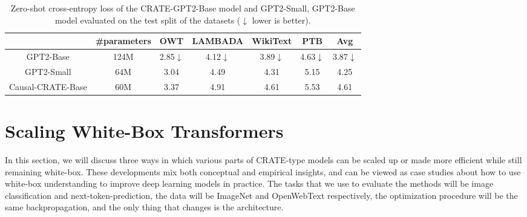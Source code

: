 \documentclass[../../book-main.tex]{subfiles}
\begin{document}
\begin{table}
\def\arraystretch{1.1}
    \small
    \caption{\small Zero-shot cross-entropy loss of the CRATE-GPT2-Base model and GPT2-Small, GPT2-Base model evaluated on the test split of the datasets ($\downarrow$ lower is better). 
    }
    \centering
    \begin{tabular}{ccccccc}
    \hline
    & \#parameters & \textbf{OWT} & \textbf{LAMBADA} & \textbf{WikiText} & \textbf{PTB} & \textbf{Avg} \\
     \hline
     GPT2-Base  & {124M} & 2.85$\downarrow$ & 4.12$\downarrow$ & 3.89$\downarrow$ & 4.63$\downarrow$ & 3.87$\downarrow$ \\
     {GPT2-Small } &  {64M} & {3.04} & {4.49} & {4.31} & {5.15} & {4.25} \\
     Causal-CRATE-Base & {60M} & 3.37 & 4.91 & 4.61 & 5.53 & 4.61 \\
     \hline
    \end{tabular}
    \label{tab:gpt-eval}
\end{table} 































\section{Scaling White-Box Transformers}\label{sec:scalable}

In this section, we will discuss three ways in which various parts of CRATE-type models can be scaled up or made more efficient while still remaining white-box. These developments mix both conceptual and empirical insights, and can be viewed as case studies about how to use white-box understanding to improve deep learning models in practice. The tasks that we use to evaluate the methods will be image classification and next-token-prediction, the data will be ImageNet and OpenWebText respectively, the optimization procedure will be the same backpropagation, and the only thing that changes is the architecture.
\end{document}
